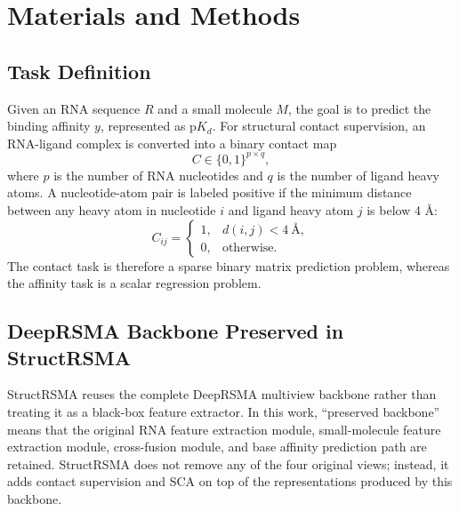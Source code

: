﻿\documentclass[journal=jcisd8,manuscript=article]{achemso}
\begin{document}
\section{Materials and Methods}

\subsection{Task Definition}

Given an RNA sequence $R$ and a small molecule $M$, the goal is to predict the binding affinity $y$, represented as p$K_d$. For structural contact supervision, an RNA-ligand complex is converted into a binary contact map
\begin{equation}
C \in \{0,1\}^{p \times q},
\end{equation}
where $p$ is the number of RNA nucleotides and $q$ is the number of ligand heavy atoms. A nucleotide-atom pair is labeled positive if the minimum distance between any heavy atom in nucleotide $i$ and ligand heavy atom $j$ is below 4 \AA:
\begin{equation}
C_{ij} =
\begin{cases}
1, & d(i,j) < 4\ \text{\AA},\\
0, & \text{otherwise}.
\end{cases}
\end{equation}
The contact task is therefore a sparse binary matrix prediction problem, whereas the affinity task is a scalar regression problem.

\subsection{DeepRSMA Backbone Preserved in StructRSMA}

StructRSMA reuses the complete DeepRSMA multiview backbone rather than treating it as a black-box feature extractor. In this work, ``preserved backbone'' means that the original RNA feature extraction module, small-molecule feature extraction module, cross-fusion module, and base affinity prediction path are retained.\cite{Huang2024DeepRSMA} StructRSMA does not remove any of the four original views; instead, it adds contact supervision and SCA on top of the representations produced by this backbone.
\end{document}
